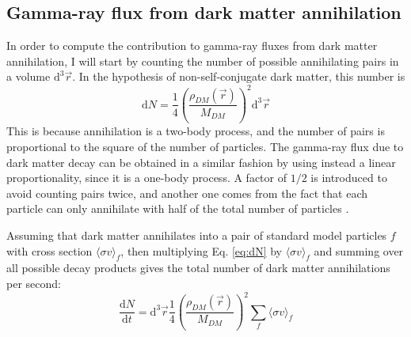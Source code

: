\subsection{Gamma-ray flux from dark matter annihilation}
In order to compute the contribution to gamma-ray fluxes from dark matter annihilation, I will start by counting the number of possible annihilating pairs in a volume \(\mathrm{d}^3 \vec{r}\). In the hypothesis of non-self-conjugate dark matter, this number is
\begin{equation}\label{eq:dN}
	\mathrm{d} N = \frac{1}{4} \left( \frac{\rho_{DM} (\vec{r})}{M_{DM} } \right) ^2 \mathrm{d}^3 \vec{r}
\end{equation}
This is because annihilation is a two-body process, and the number of pairs is proportional to the square of the number of particles. The gamma-ray flux due to dark matter decay can be obtained in a similar fashion by using instead a linear proportionality, since it is a one-body process. A factor of \(1 /2\) is introduced to avoid counting pairs twice, and another one comes from the fact that each particle can only annihilate with half of the total number of particles \cite{Sala_2019}.

Assuming that dark matter annihilates into a pair of standard model particles \(f\) with cross section \(\langle \sigma v \rangle_f \), then multiplying Eq. \eqref{eq:dN} by \(\langle \sigma v \rangle_f \) and summing over all possible decay products gives the total number of dark matter annihilations per second:
\begin{equation}
	\frac{\mathrm{d}N}{\mathrm{d}t} = \mathrm{d} ^3 \vec{r} \frac{1}{4} \left( \frac{\rho_{DM} (\vec{r})}{M_{DM} } \right)^2 \sum_{f} \langle \sigma v \rangle_f
\end{equation}

